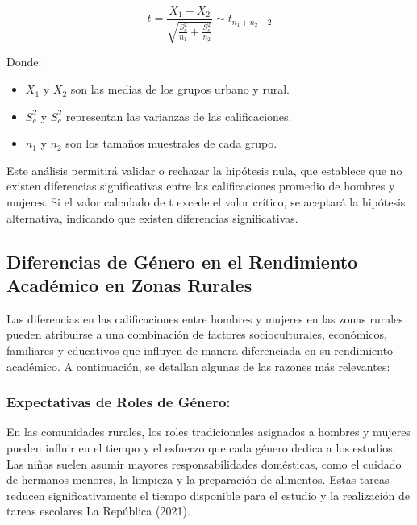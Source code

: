 \documentclass[
]{article}
\begin{document}
\[
t = \frac{X_1 - X_2}{\sqrt{\frac{S_c^2}{n_1} + \frac{S_c^2}{n_2}}}\sim t_{n_{1}+n_{2}-2}
\]

Donde:

\begin{itemize}
    \item $X_1$ y $X_2$ son las medias de los grupos urbano y rural.
    \item $S_c^2$ y $S_c^2$ representan las varianzas de las calificaciones.
    \item $n_1$ y $n_2$ son los tamaños muestrales de cada grupo.
\end{itemize}

Este análisis permitirá validar o rechazar la hipótesis nula, que
establece que no existen diferencias significativas entre las
calificaciones promedio de hombres y mujeres. Si el valor calculado de t
excede el valor crítico, se aceptará la hipótesis alternativa, indicando
que existen diferencias significativas.

\subsection*{Diferencias de Género en el Rendimiento Académico en Zonas
Rurales}\label{diferencias-de-guxe9nero-en-el-rendimiento-acaduxe9mico-en-zonas-rurales}

\vspace{0.5cm}

Las diferencias en las calificaciones entre hombres y mujeres en las
zonas rurales pueden atribuirse a una combinación de factores
socioculturales, económicos, familiares y educativos que influyen de
manera diferenciada en su rendimiento académico. A continuación, se
detallan algunas de las razones más relevantes:

\subsubsection{Expectativas de Roles de
Género:}\label{expectativas-de-roles-de-guxe9nero}

En las comunidades rurales, los roles tradicionales asignados a hombres
y mujeres pueden influir en el tiempo y el esfuerzo que cada género
dedica a los estudios. Las niñas suelen asumir mayores responsabilidades
domésticas, como el cuidado de hermanos menores, la limpieza y la
preparación de alimentos. Estas tareas reducen significativamente el
tiempo disponible para el estudio y la realización de tareas escolares
La República (2021).
\end{document}
